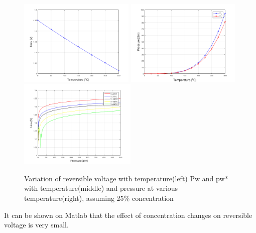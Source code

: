 \begin{figure} [h] 

\includegraphics[width=5.5cm]{temperature.png} 
\includegraphics[width=5.5cm]{pw.png} 
\includegraphics[width=5.6cm] {pressure.png} 

\caption{Variation of reversible voltage with temperature(left) Pw and pw* with temperature(middle) and pressure at various temperature(right), assuming 25\% concentration} 

\end{figure} 


It can be shown on Matlab that the effect of concentration changes on reversible voltage is very small. 

